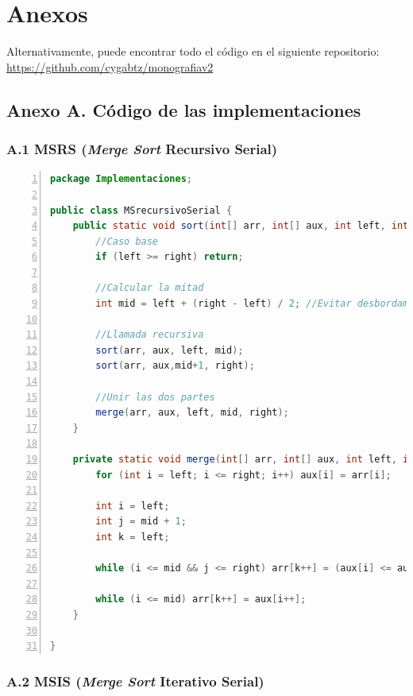\documentclass[titlepage]{article}
\begin{document}
\newpage
\section*{Anexos}

Alternativamente, puede encontrar todo el código en el siguiente repositorio: \url{https://github.com/cygabtz/monografiav2}

\subsection*{Anexo A. Código de las implementaciones}

\subsubsection*{A.1 MSRS (\textit{Merge Sort} Recursivo Serial)}

	\begin{lstlisting}[language=java, frame=single, numbers=left, float=h]
package Implementaciones;

public class MSrecursivoSerial {
	public static void sort(int[] arr, int[] aux, int left, int right) {
		//Caso base
		if (left >= right) return;
		
		//Calcular la mitad
		int mid = left + (right - left) / 2; //Evitar desbordamiento de Integer.MAX_VALUE
		
		//Llamada recursiva
		sort(arr, aux, left, mid);
		sort(arr, aux,mid+1, right);
		
		//Unir las dos partes
		merge(arr, aux, left, mid, right);
	}
	
	private static void merge(int[] arr, int[] aux, int left, int mid, int right) {
		for (int i = left; i <= right; i++) aux[i] = arr[i];
		
		int i = left;       
		int j = mid + 1;    
		int k = left;       
		
		while (i <= mid && j <= right) arr[k++] = (aux[i] <= aux[j])? aux[i++] : aux[j++];
		
		while (i <= mid) arr[k++] = aux[i++];
	}
	
}
	\end{lstlisting}


\newpage

\subsubsection*{A.2 MSIS (\textit{Merge Sort} Iterativo Serial)}
\end{document}
